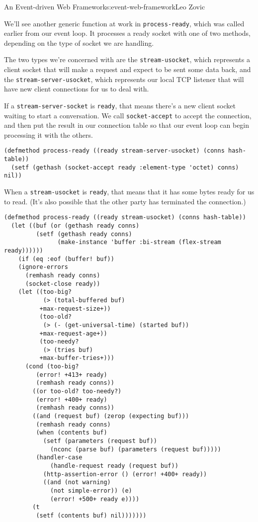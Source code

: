 \begin{aosachapter}{An Event-driven Web Framework}{s:event-web-framework}{Leo Zovic}
\label{processing-sockets}

We'll see another generic function at work in \texttt{process-ready},
which was called earlier from our event loop. It processes a ready
socket with one of two methods, depending on the type of socket we are
handling.

The two types we're concerned with are the \texttt{stream-usocket},
which represents a client socket that will make a request and expect to
be sent some data back, and the \texttt{stream-server-usocket}, which
represents our local TCP listener that will have new client connections
for us to deal with.

If a \texttt{stream-server-socket} is \texttt{ready}, that means there's
a new client socket waiting to start a conversation. We call
\texttt{socket-accept} to accept the connection, and then put the result
in our connection table so that our event loop can begin processing it
with the others.

\begin{verbatim}
(defmethod process-ready ((ready stream-server-usocket) (conns hash-table))
  (setf (gethash (socket-accept ready :element-type 'octet) conns) nil))
\end{verbatim}

When a \texttt{stream-usocket} is \texttt{ready}, that means that it has
some bytes ready for us to read. (It's also possible that the other
party has terminated the connection.)

\begin{verbatim}
(defmethod process-ready ((ready stream-usocket) (conns hash-table))
  (let ((buf (or (gethash ready conns)
         (setf (gethash ready conns)
               (make-instance 'buffer :bi-stream (flex-stream ready))))))
    (if (eq :eof (buffer! buf))
    (ignore-errors
      (remhash ready conns)
      (socket-close ready))
    (let ((too-big?
           (> (total-buffered buf)
          +max-request-size+))
          (too-old?
           (> (- (get-universal-time) (started buf))
          +max-request-age+))
          (too-needy?
           (> (tries buf)
          +max-buffer-tries+)))
      (cond (too-big?
         (error! +413+ ready)
         (remhash ready conns))
        ((or too-old? too-needy?)
         (error! +400+ ready)
         (remhash ready conns))
        ((and (request buf) (zerop (expecting buf)))
         (remhash ready conns)
         (when (contents buf)
           (setf (parameters (request buf))
             (nconc (parse buf) (parameters (request buf)))))
         (handler-case
             (handle-request ready (request buf))
           (http-assertion-error () (error! +400+ ready))
           ((and (not warning)
             (not simple-error)) (e)
             (error! +500+ ready e))))
        (t
         (setf (contents buf) nil)))))))
\end{verbatim}


\end{aosachapter}
